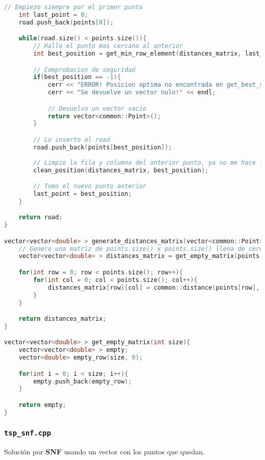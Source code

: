 \documentclass[10pt, a4paper]{article}
\theoremstyle{theorem-style}
\theoremstyle{theorem-style}
\theoremstyle{definition-style}
\theoremstyle{remark-style}
\theoremstyle{example-style}
\theoremstyle{definition-style}
\theoremstyle{remark-style}
\begin{document}
\begin{lstlisting}[language=C]
    // Empiezo siempre por el primer punto
    int last_point = 0;
    road.push_back(points[0]);

    while(road.size() < points.size()){
        // Hallo el punto mas cercano al anterior
        int best_position = get_min_row_element(distances_matrix, last_point);

        // Comprobacion de seguridad
        if(best_position == -1){
            cerr << "ERROR! Posicion optima no encontrada en get_best_solution()" << endl;
            cerr << "Se devuelve un vector nulo!" << endl;

            // Devuelvo un vector vacio
            return vector<common::Point>();
        }

        // Lo inserto al road
        road.push_back(points[best_position]);
        
        // Limpio la fila y columna del anterior punto, ya no me hace falta
        clean_position(distances_matrix, best_position);

        // Tomo el nuevo punto anterior
        last_point = best_position;
    }

    return road;
}

vector<vector<double> > generate_distances_matrix(vector<common::Point> points){
    // Genero una matriz de points.size() x points.size() llena de ceros
    vector<vector<double> > distances_matrix = get_empty_matrix(points.size());

    for(int row = 0; row < points.size(); row++){
        for(int col = 0; col < points.size(); col++){
            distances_matrix[row][col] = common::distance(points[row], points[col]);
        }
    }       

    return distances_matrix;
}

vector<vector<double> > get_empty_matrix(int size){
    vector<vector<double> > empty;
    vector<double> empty_row(size, 0);

    for(int i = 0; i < size; i++){
        empty.push_back(empty_row);
    }

    return empty;
}
\end{lstlisting}

\subsubsection*{\texttt{tsp\_snf.cpp}}

Solución por \textbf{SNF} usando un vector con los puntos que quedan.
\end{document}
